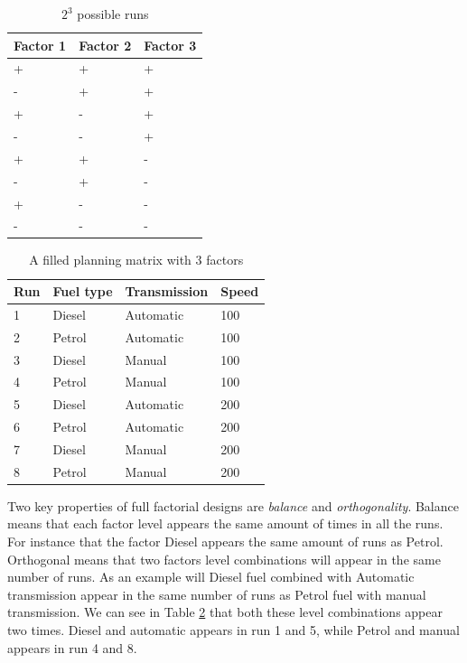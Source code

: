 \documentclass{llncs}
\begin{document}
\begin{table}
\begin{center}
    \begin{tabular}{ | l  l  l |}
    \hline
    {\bf Factor 1} & {\bf Factor 2} & {\bf Factor 3} \\ \hline
	 + & + & + \\ \hline
	  - & + & + \\ \hline
	 + & - & + \\ \hline
	  - & - & + \\ \hline
	 + & + & - \\ \hline
	  - & + & - \\ \hline
	 + & - & - \\ \hline
	  - & - &  - \\ \hline
    \end{tabular}
\end{center}
\caption{$2^3$ possible runs}\label{designs}
\end{table}

\begin{table}
\begin{center}
    \begin{tabular}{ | l | l  l  l |}
    \hline
    {\bf Run} &  {\bf Fuel type} & {\bf Transmission} & {\bf Speed} \\ \hline
	 1 & Diesel & Automatic & 100 \\ \hline
	 2 & Petrol & Automatic & 100 \\ \hline
	 3 & Diesel & Manual & 100 \\ \hline
	 4 & Petrol & Manual & 100 \\ \hline
	 5 & Diesel & Automatic & 200 \\ \hline
	 6 & Petrol & Automatic & 200 \\ \hline
	 7 & Diesel & Manual & 200 \\ \hline
	 8 & Petrol & Manual &  200 \\ \hline
    \end{tabular}
\end{center}
\caption{A filled planning matrix with 3 factors}\label{designsspec}
\end{table}

Two key properties of full factorial designs are \textit{balance} and \textit{orthogonality}. 
Balance means that each factor level appears the same amount of times in all the runs. For instance that 
the factor Diesel appears the same amount of runs as Petrol. Orthogonal means that two factors level combinations 
will appear in the same number of runs. As an example will Diesel fuel combined with Automatic transmission 
appear in the same number of runs as Petrol fuel with manual transmission. We can see in Table \ref{designsspec} 
that both these level combinations appear two times. Diesel and automatic appears in run 1 and 5, while Petrol and 
manual appears in run 4 and 8.
\end{document}

